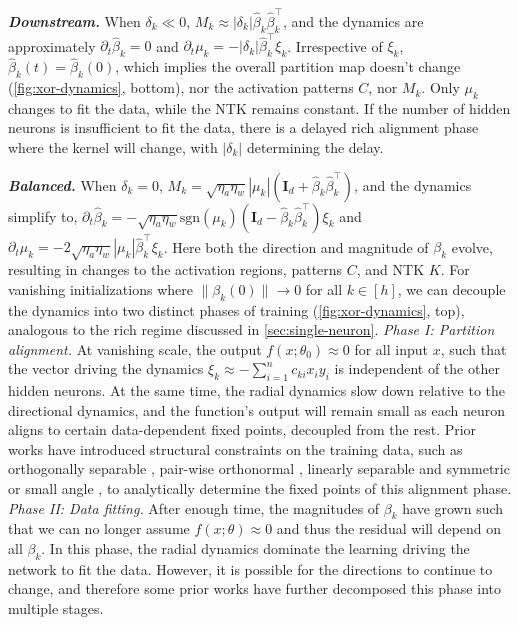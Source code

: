 \documentclass{article}
\theoremstyle{plain}
\theoremstyle{definition}
\theoremstyle{remark}
\begin{document}
%
\emph{\textbf{Downstream.}}
%
When $\delta_k \ll 0 $, $M_k \approx |\delta_k|\hat{\beta}_k\hat{\beta}_k^\intercal$, and the dynamics are approximately $\partial_t\hat{\beta}_k = 0$ and $\partial_t\mu_k = -|\delta_k|\hat{\beta}_k^\intercal \xi_k$.
%
Irrespective of $\xi_k$, $\hat{\beta}_k(t) =  \hat{\beta}_k(0)$, which implies the overall partition map doesn't change (\cref{fig:xor-dynamics}, bottom), nor the activation patterns $C$, nor $M_k$.
%
Only $\mu_k$ changes to fit the data, while the NTK remains constant.
%
If the number of hidden neurons is insufficient to fit the data, there is a delayed rich alignment phase where the kernel will change, with $|\delta_k|$ determining the delay.


\emph{\textbf{Balanced.}}
When $\delta_k = 0$, $M_k = \sqrt{\eta_a\eta_w}|\mu_k|(\mathbf{I}_d + \hat{\beta}_k\hat{\beta}_k^\intercal)$, and the dynamics simplify to, $ \partial_t\hat{\beta}_k = -\sqrt{\eta_a\eta_w}\mathrm{sgn}(\mu_k)(\mathbf{I}_d - \hat{\beta}_k\hat{\beta}_k^\intercal)\xi_k$ and $\partial_t\mu_k = -2\sqrt{\eta_a\eta_w}|\mu_k|\hat{\beta}_k^\intercal \xi_k$.
%
Here both the direction and magnitude of $\beta_k$ evolve, resulting in changes to the activation regions, patterns $C$, and NTK $K$.
%
For vanishing initializations where $\|\beta_k(0)\| \to 0$ for all $k \in [h]$, we can decouple the dynamics into two distinct phases of training (\cref{fig:xor-dynamics}, top), analogous to the rich regime discussed in \cref{sec:single-neuron}.
%
\emph{Phase I: Partition alignment.} 
% 
At vanishing scale, the output $f(x;\theta_0) \approx 0$ for all input $x$, such that the vector driving the dynamics $\xi_k \approx -\sum_{i=1}^n c_{ki}x_iy_i$ is independent of the other hidden neurons. 
%
At the same time, the radial dynamics slow down relative to the directional dynamics, and the function's output will remain small as each neuron aligns to certain data-dependent fixed points, decoupled from the rest.
% 
Prior works have introduced structural constraints on the training data, such as orthogonally separable \cite{phuong2020inductive, wang2022early, min2023early}, pair-wise orthonormal \cite{boursier2022gradient}, linearly separable and symmetric \cite{lyu2021gradient} or small angle \cite{wang2024understanding}, to analytically determine the fixed points of this alignment phase.
%
\emph{Phase II: Data fitting.}
%
After enough time, the magnitudes of $\beta_k$ have grown such that we can no longer assume $f(x;\theta) \approx 0$ and thus the residual will depend on all $\beta_k$.
%
In this phase, the radial dynamics dominate the learning driving the network to fit the data.
%
However, it is possible for the directions to continue to change, and therefore some prior works have further decomposed this phase into multiple stages.
\end{document}
